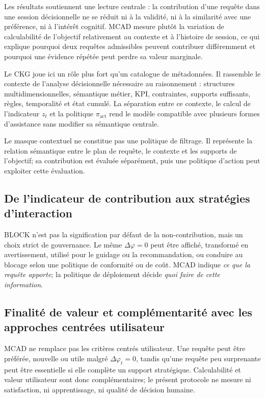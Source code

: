 \documentclass[journal]{IEEEtran}
\begin{document}
Les résultats soutiennent une lecture centrale : la contribution d'une requête dans une session décisionnelle ne se réduit ni à la validité, ni à la similarité avec une préférence, ni à l'intérêt cognitif. MCAD mesure plutôt la variation de calculabilité de l'objectif relativement au contexte et à l'histoire de session, ce qui explique pourquoi deux requêtes admissibles peuvent contribuer différemment et pourquoi une évidence répétée peut perdre sa valeur marginale.

Le CKG joue ici un rôle plus fort qu'un catalogue de métadonnées. Il rassemble le contexte de l'analyse décisionnelle nécessaire au raisonnement : structures multidimensionnelles, sémantique métier, KPI, contraintes, supports suffisants, règles, temporalité et état cumulé. La séparation entre ce contexte, le calcul de l'indicateur $z_t$ et la politique $\pi_{\mathrm{act}}$ rend le modèle compatible avec plusieurs formes d'assistance sans modifier sa sémantique centrale.

Le masque contextuel ne constitue pas une politique de filtrage. Il représente la relation sémantique entre le plan de requête, le contexte et les supports de l'objectif; sa contribution est évaluée séparément, puis une politique d'action peut exploiter cette évaluation.

\subsection{De l'indicateur de contribution aux stratégies d'interaction}

BLOCK n'est pas la signification par défaut de la non-contribution, mais un choix strict de gouvernance. Le même $\Delta\varphi=0$ peut être affiché, transformé en avertissement, utilisé pour le guidage ou la recommandation, ou conduire au blocage selon une politique de conformité ou de coût. MCAD indique \emph{ce que la requête apporte}; la politique de déploiement décide \emph{quoi faire de cette information}.

\subsection{Finalité de valeur et complémentarité avec les approches centrées utilisateur}

MCAD ne remplace pas les critères centrés utilisateur. Une requête peut être préférée, nouvelle ou utile malgré $\Delta\varphi_t=0$, tandis qu'une requête peu surprenante peut être essentielle si elle complète un support stratégique. Calculabilité et valeur utilisateur sont donc complémentaires; le présent protocole ne mesure ni satisfaction, ni apprentissage, ni qualité de décision humaine.
\end{document}
